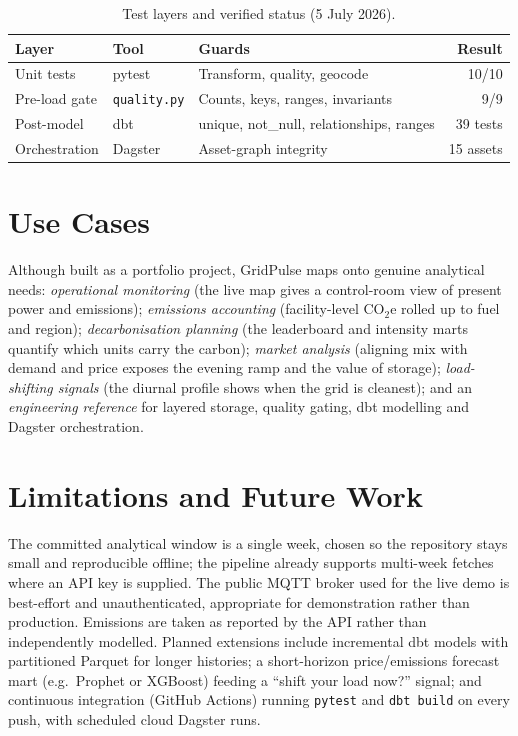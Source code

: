 \documentclass[onecolumn,11pt]{IEEEtran}
\begin{document}
\begin{table}[t]
\caption{Test layers and verified status (5 July 2026).}
\label{tab:tests}
\centering\footnotesize
\begin{tabular}{@{}p{}p{}p{}r@{}}
\toprule
\textbf{Layer} & \textbf{Tool} & \textbf{Guards} & \textbf{Result}\\
\midrule
Unit tests & pytest & Transform, quality, geocode & 10/10\\
Pre-load gate & \texttt{quality.py} & Counts, keys, ranges, invariants & 9/9\\
Post-model & dbt & unique, not\_null, relationships, ranges & 39 tests\\
Orchestration & Dagster & Asset-graph integrity & 15 assets\\
\bottomrule
\end{tabular}
\end{table}

\section{Use Cases}\label{sec:use}
Although built as a portfolio project, GridPulse maps onto genuine analytical
needs: \emph{operational monitoring} (the live map gives a control-room view of
present power and emissions); \emph{emissions accounting} (facility-level
CO$_2$e rolled up to fuel and region); \emph{decarbonisation planning} (the
leaderboard and intensity marts quantify which units carry the carbon);
\emph{market analysis} (aligning mix with demand and price exposes the evening
ramp and the value of storage); \emph{load-shifting signals} (the diurnal
profile shows when the grid is cleanest); and an \emph{engineering reference} for
layered storage, quality gating, dbt modelling and Dagster orchestration.

\section{Limitations and Future Work}\label{sec:lim}
The committed analytical window is a single week, chosen so the repository stays
small and reproducible offline; the pipeline already supports multi-week fetches
where an API key is supplied. The public MQTT broker used for the live demo is
best-effort and unauthenticated, appropriate for demonstration rather than
production. Emissions are taken as reported by the API rather than independently
modelled. Planned extensions include incremental dbt models with partitioned
Parquet for longer histories; a short-horizon price/emissions forecast mart
(e.g.\ Prophet or XGBoost) feeding a ``shift your load now?'' signal; and
continuous integration (GitHub Actions) running \texttt{pytest} and
\texttt{dbt build} on every push, with scheduled cloud Dagster runs.
\end{document}
